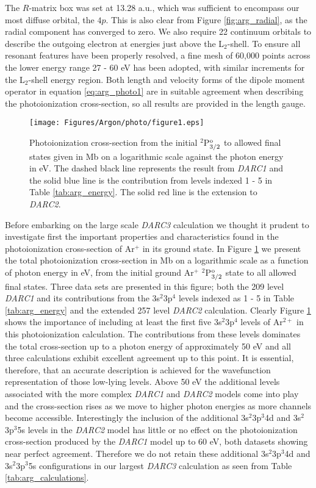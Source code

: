 The $R$-matrix box was set at 13.28 a.u., which was sufficient to encompass our most diffuse orbital, the $4p$. This is also clear from Figure \ref{fig:arg_radial}, as the radial component has converged to zero. We also require 22 continuum orbitals to describe the outgoing electron at energies just above the L$_{2}$-shell. To ensure all resonant features have been properly resolved, a fine mesh of 60,000 points across the lower energy range 27 - 60 eV has been adopted, with similar increments for the L$_{2}$-shell energy region. Both length and velocity forms of the dipole moment operator in equation \ref{eq:arg_photo1} are in suitable agreement when describing the photoionization cross-section, so all results are provided in the length gauge.

%
\begin{sidewaysfigure}
\centering
\texttt{[image: Figures/Argon/photo/figure1.eps]}
\caption{Photoionization cross-section from the initial $^2$P$^{\rm{o}}_{3/2}$ to allowed final states given in Mb on a logarithmic scale against the photon energy in eV. The dashed black line represents the result from \textit{DARC1} and the solid blue line is the contribution from levels indexed 1 - 5 in Table \ref{tab:arg_energy}. The solid red line is the extension to \textit{DARC2}. \label{fig:arg_partial}}
\end{sidewaysfigure}
%

Before embarking on the large scale \textit{DARC3} calculation we thought it prudent to investigate first the important properties and characteristics found in the photoionization cross-section of Ar$^{+}$ in its ground state. In Figure \ref{fig:arg_partial}
we present the total photoionization cross-section in Mb on a logarithmic scale as a function of photon energy in eV, from the initial ground Ar$^{+}$ $^2$P$^{\rm{o}}_{3/2}$ state to all allowed final states. Three data sets are presented in this figure; both the 209 level \textit{DARC1} and its contributions from the 3s$^2$3p$^4$ levels indexed as 1 - 5 in Table \ref{tab:arg_energy} and the extended 257 level \textit{DARC2} calculation. Clearly Figure \ref{fig:arg_partial} shows the importance of including at least the first five 3s$^2$3p$^4$ levels of Ar$^{2+}$ in this photoionization calculation. The contributions from these levels dominates the total cross-section up to a photon energy of approximately 50 eV and all three calculations exhibit excellent agreement up to this point. It is essential, therefore, that an accurate description is achieved for the wavefunction representation of those low-lying levels. Above 50 eV the additional levels associated with the more complex \textit{DARC1} and \textit{DARC2} models come into play and the cross-section rises as we move to higher photon energies as more channels become accessible. Interestingly the inclusion of the additional 3s$^2$3p$^3$4d and 3s$^2$3p$^3$5s levels in the \textit{DARC2} model has little or no effect on the photoionization cross-section produced by the \textit{DARC1} model up to 60 eV, both datasets showing near perfect agreement. Therefore we do not retain these additional 3s$^2$3p$^3$4d and 3s$^2$3p$^3$5s configurations in our largest \textit{DARC3} calculation as seen from Table \ref{tab:arg_calculations}.

